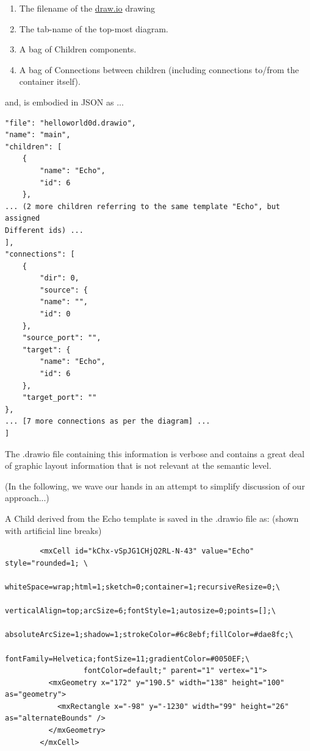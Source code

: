 \documentclass[10pt,anonymous,review]{acmart}
\begin{document}
\begin{enumerate}
\item The filename of the \href{http://draw.io}{draw.io} drawing

\item The tab-name of the top-most diagram.

\item A bag of Children components.

\item A bag of Connections between children (including connections to/from the container itself).

\end{enumerate}
and, is embodied in JSON as ... 
\begin{verbatim}
"file": "helloworld0d.drawio",
"name": "main",
"children": [
    {
        "name": "Echo",
        "id": 6
    },
... (2 more children referring to the same template "Echo", but assigned
Different ids) ...
],
"connections": [
    {
        "dir": 0,
        "source": {
        "name": "",
        "id": 0
    },
    "source_port": "",
    "target": {
        "name": "Echo",
        "id": 6
    },
    "target_port": ""
},
... [7 more connections as per the diagram] ...
]
\end{verbatim}

The .drawio file containing this information is verbose and contains a great deal of graphic layout information that is not relevant at the semantic level.

(In the following, we wave our hands in an attempt to simplify discussion of our approach...)

A Child derived from the Echo template is saved in the .drawio file as: (shown with artificial line breaks)
\begin{verbatim}
        <mxCell id="kChx-vSpJG1CHjQ2RL-N-43" value="Echo" style="rounded=1; \
                  whiteSpace=wrap;html=1;sketch=0;container=1;recursiveResize=0;\
                  verticalAlign=top;arcSize=6;fontStyle=1;autosize=0;points=[];\
                  absoluteArcSize=1;shadow=1;strokeColor=#6c8ebf;fillColor=#dae8fc;\
                  fontFamily=Helvetica;fontSize=11;gradientColor=#0050EF;\
                  fontColor=default;" parent="1" vertex="1">
          <mxGeometry x="172" y="190.5" width="138" height="100" as="geometry">
            <mxRectangle x="-98" y="-1230" width="99" height="26" as="alternateBounds" />
          </mxGeometry>
        </mxCell>
\end{verbatim}
\end{document}
